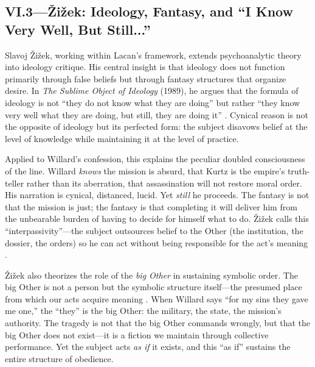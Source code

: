 \subsection*{VI.3—{\v{Z}}i{\v{z}}ek: Ideology, Fantasy, and ``I Know Very Well, But Still...''}
\label{ssec:vi-zizek}

Slavoj {\v{Z}}i{\v{z}}ek, working within Lacan's framework, extends psychoanalytic theory into
ideology critique. His central insight is that ideology does not function primarily through
false beliefs but through fantasy structures that organize desire. In \textit{The Sublime
	Object of Ideology} (1989), he argues that the formula of ideology is not ``they do not know
what they are doing'' but rather ``they know very well what they are doing, but still, they
are doing it'' \parencite[p.~32]{ZizekSublime1999}. Cynical reason is not the opposite of
ideology but its perfected form: the subject disavows belief at the level of knowledge while
maintaining it at the level of practice.

Applied to Willard's confession, this explains the peculiar doubled consciousness of the line.
Willard \emph{knows} the mission is absurd, that Kurtz is the empire's truth-teller rather
than its aberration, that assassination will not restore moral order. His narration is cynical,
distanced, lucid. Yet \emph{still} he proceeds. The fantasy is not that the mission is just;
the fantasy is that completing it will deliver him from the unbearable burden of having to
decide for himself what to do. {\v{Z}}i{\v{z}}ek calls this ``interpassivity''---the subject
outsources belief to the Other (the institution, the dossier, the orders) so he can act
without being responsible for the act's meaning \parencite{ZizekSublime1999}.

{\v{Z}}i{\v{z}}ek also theorizes the role of the \emph{big Other} in sustaining symbolic
order. The big Other is not a person but the symbolic structure itself---the presumed place
from which our acts acquire meaning \parencite{ZizekSublime1999}. When Willard says ``for my
sins they gave me one,'' the ``they'' is the big Other: the military, the state, the mission's
authority. The tragedy is not that the big Other commands wrongly, but that the big Other does
not exist---it is a fiction we maintain through collective performance. Yet the subject acts
\emph{as if} it exists, and this ``as if'' sustains the entire structure of obedience.

